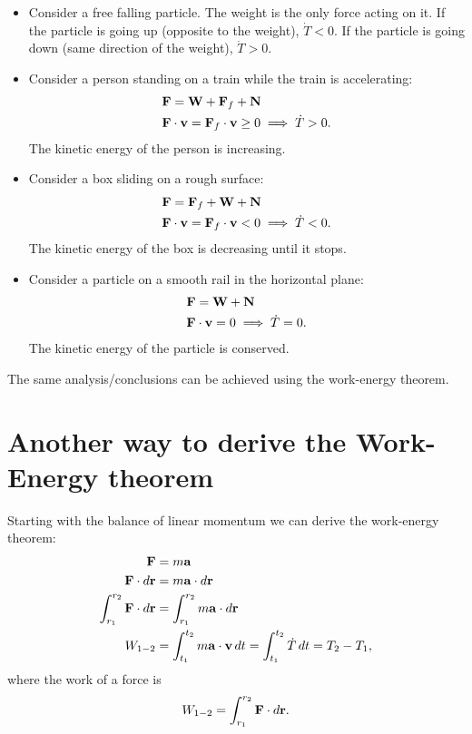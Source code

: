 \documentclass[
  letterpaper,
  DIV=11,
  numbers=noendperiod]{scrreprt}
\begin{document}
\begin{itemize}
\item
  Consider a free falling particle. The weight is the only force acting
  on it. If the particle is going up (opposite to the weight),
  \(\dot{T}<0\). If the particle is going down (same direction of the
  weight), \(\dot{T}>0\).
\item
  Consider a person standing on a train while the train is accelerating:
  \begin{align}
  & {\bf F} = {\bf W}+{\bf F}_f+{\bf N}\\
  & {\bf F}\cdot{\bf v} = {\bf F}_f\cdot{\bf v} \geq 0 \implies \dot{T}>0.
  \end{align} The kinetic energy of the person is increasing.
\item
  Consider a box sliding on a rough surface: \begin{align}
  & {\bf F} = {\bf F}_f+{\bf W}+{\bf N}\\
  & {\bf F}\cdot{\bf v} = {\bf F}_f\cdot{\bf v} < 0 \implies \dot{T}<0.
  \end{align} The kinetic energy of the box is decreasing until it
  stops.
\item
  Consider a particle on a smooth rail in the horizontal plane:
  \begin{align}
  & {\bf F} = {\bf W}+{\bf N}\\
  & {\bf F}\cdot{\bf v} = 0\implies\dot{T}=0.
  \end{align} The kinetic energy of the particle is conserved.
\end{itemize}

The same analysis/conclusions can be achieved using the work-energy
theorem.

\section{Another way to derive the Work-Energy
theorem}\label{another-way-to-derive-the-work-energy-theorem}

Starting with the balance of linear momentum we can derive the
work-energy theorem: \begin{align}
{\bf F} &= m{\bf a}\\
{\bf F}\cdot d{\bf r} &= m{\bf a}\cdot d{\bf r}\\
\int_{r_1}^{r_2} {\bf F}\cdot d{\bf r} &= \int_{r_1}^{r_2} m{\bf a}\cdot d{\bf r}\\
W_{1-2} &= \int_{t_1}^{t_2} m{\bf a}\cdot {\bf v}\, dt = \int_{t_1}^{t_2}\dot{T}\, dt = T_2-T_1,
\end{align} where the work of a force is
\[W_{1-2} = \int_{r_1}^{r_2} {\bf F}\cdot d{\bf r}.\]
\end{document}
